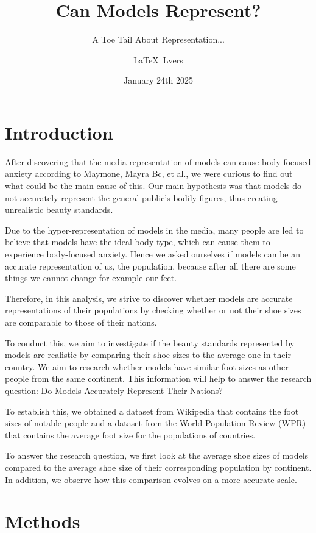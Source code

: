 \documentclass{article}
\title{Can Models Represent?}
\subtitle{A Toe Tail About Representation...}
\author{\LaTeX\ L{\heart}vers}
\date{January 24th 2025}
\begin{document}
\maketitle

\section{Introduction}

After discovering that the media representation of models can cause body-focused anxiety according to Maymone, Mayra Bc, et al., we were curious to find out what could be the main cause of this.
\cite{bodies}
Our main hypothesis was that models do not accurately represent the general public's bodily figures, thus creating unrealistic beauty standards. 

Due to the hyper-representation of models in the media, many people are led to believe that models have the ideal body type, which can cause them to experience body-focused anxiety.
Hence we asked ourselves if models can be an accurate representation of us, the population, because after all there are some things we cannot change for example our feet.

Therefore, in this analysis, we strive to discover whether models are accurate representations of their populations by checking whether or not their shoe sizes are comparable to those of their nations. 

To conduct this, we aim to investigate if the beauty standards represented by models are realistic by comparing their shoe sizes to the average one in their country. 
We aim to research whether models have similar foot sizes as other people from the same continent. This information will help to answer the research question: Do Models Accurately Represent Their Nations? 

To establish this, we obtained a dataset from Wikipedia that contains the foot sizes of notable people and a dataset from the World Population Review (WPR) that contains the average foot size for the populations of countries. 

To answer the research question, we first look at the average shoe sizes of models compared to the average shoe size of their corresponding population by continent. In addition, we observe how this comparison evolves on a more accurate scale.

\section{Methods}
 
\end{document}
